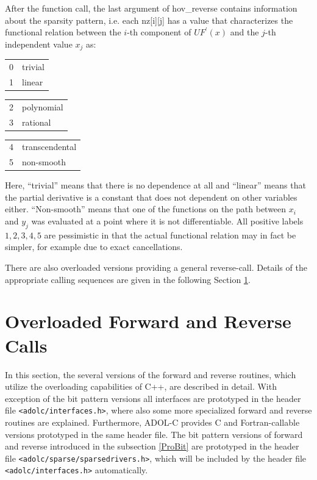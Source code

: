 \documentclass[11pt,twoside]{article}
\begin{document}
After the function call, the last argument of {\sf hov\_reverse} 
contains information about the sparsity pattern, i.e. each {\sf nz[i][j]}
has a value that characterizes the functional relation between the
$i$-th component of $UF^\prime(x)$ and the $j$-th independent value
$x_j$ as:
\begin{center}
\begin{tabular}{ll}
 0 & trivial \\
 1 & linear 
\end{tabular} \hspace*{4ex}
\begin{tabular}{ll}
 2 & polynomial\\
 3 & rational
\end{tabular} \hspace*{4ex}
\begin{tabular}{ll}
 4 & transcendental\\
 5 & non-smooth
\end{tabular}
\end{center}
Here, ``trivial'' means that there is no dependence at all and ``linear'' means
that the partial derivative is a constant that
does not dependent on other variables either. ``Non-smooth'' means that one of
the functions on the path between $x_i$ and $y_j$ was evaluated at a point 
where it is not differentiable.  All positive labels
$1, 2, 3, 4, 5$ are pessimistic in that the actual functional relation may
in fact be simpler, for example due to exact cancellations.  

There are also overloaded versions providing a general {\sf reverse}-call.
Details of the appropriate calling sequences are given in the following Section \ref{forw_rev}.
%
\section{Overloaded Forward and Reverse Calls}
\label{forw_rev}
%
In this section, the several versions of the {\sf forward} and 
{\sf reverse} routines, which utilize the overloading capabilities
of C++, are described in detail. With exception of the bit pattern
versions all interfaces are prototyped in the header file 
\verb=<adolc/interfaces.h>=, where also some more specialized {\sf forward}
and {\sf reverse} routines are explained. Furthermore, \mbox{ADOL-C} provides
C and Fortran-callable versions prototyped in the same header file.
The bit pattern versions of {\sf forward} and {\sf reverse} introduced
in the subsection \ref{ProBit} are prototyped in the header file
\verb=<adolc/sparse/sparsedrivers.h>=, which will be included by the header 
file \verb=<adolc/interfaces.h>= automatically.
%
\end{document}
